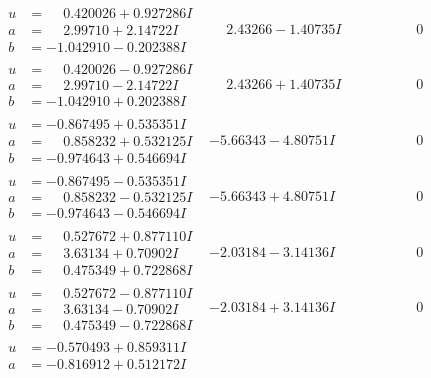 \documentclass[1p]{elsarticle_modified}
\theoremstyle{definition}
\begin{document}
$$\begin{array}{c|c|c}
 \hline 
\begin{aligned}
u &= \phantom{-}0.420026 + 0.927286 I \\
a &= \phantom{-}2.99710 + 2.14722 I \\
b &= -1.042910 - 0.202388 I\end{aligned}
 & \phantom{-}2.43266 - 1.40735 I & \phantom{-0.000000 } 0 \\ \hline\begin{aligned}
u &= \phantom{-}0.420026 - 0.927286 I \\
a &= \phantom{-}2.99710 - 2.14722 I \\
b &= -1.042910 + 0.202388 I\end{aligned}
 & \phantom{-}2.43266 + 1.40735 I & \phantom{-0.000000 } 0 \\ \hline\begin{aligned}
u &= -0.867495 + 0.535351 I \\
a &= \phantom{-}0.858232 + 0.532125 I \\
b &= -0.974643 + 0.546694 I\end{aligned}
 & -5.66343 - 4.80751 I & \phantom{-0.000000 } 0 \\ \hline\begin{aligned}
u &= -0.867495 - 0.535351 I \\
a &= \phantom{-}0.858232 - 0.532125 I \\
b &= -0.974643 - 0.546694 I\end{aligned}
 & -5.66343 + 4.80751 I & \phantom{-0.000000 } 0 \\ \hline\begin{aligned}
u &= \phantom{-}0.527672 + 0.877110 I \\
a &= \phantom{-}3.63134 + 0.70902 I \\
b &= \phantom{-}0.475349 + 0.722868 I\end{aligned}
 & -2.03184 - 3.14136 I & \phantom{-0.000000 } 0 \\ \hline\begin{aligned}
u &= \phantom{-}0.527672 - 0.877110 I \\
a &= \phantom{-}3.63134 - 0.70902 I \\
b &= \phantom{-}0.475349 - 0.722868 I\end{aligned}
 & -2.03184 + 3.14136 I & \phantom{-0.000000 } 0 \\ \hline\begin{aligned}
u &= -0.570493 + 0.859311 I \\
a &= -0.816912 + 0.512172 I \\

\end{aligned}
\end{array}$$
\end{document}
